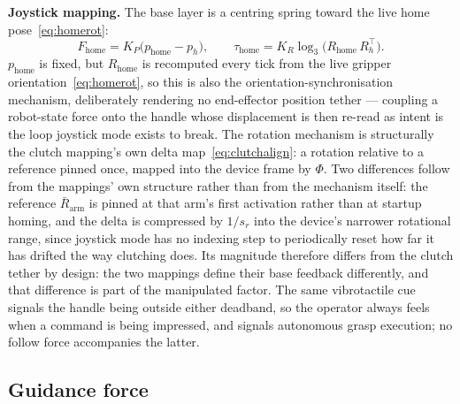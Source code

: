 \textbf{Joystick mapping.} The base layer is a centring spring toward the live home pose~\eqref{eq:homerot}:
\begin{equation}
F_{\text{home}} = K_P\bigl(p_{\text{home}} - p_h\bigr),
\qquad
\tau_{\text{home}} = K_R \log_3\!\bigl(R_{\text{home}}\,R_h^{\top}\bigr).
\label{eq:fhome}
\end{equation}
$p_{\text{home}}$ is fixed, but $R_{\text{home}}$ is recomputed every tick from the live gripper orientation~\eqref{eq:homerot}, so this is also the orientation-synchronisation mechanism, deliberately rendering no end-effector position tether --- coupling a robot-state force onto the handle whose displacement is then re-read as intent is the loop joystick mode exists to break. The rotation mechanism is structurally the clutch mapping's own delta map~\eqref{eq:clutchalign}: a rotation relative to a reference pinned once, mapped into the device frame by $\Phi$. Two differences follow from the mappings' own structure rather than from the mechanism itself: the reference $\bar{R}_{\text{arm}}$ is pinned at that arm's first activation rather than at startup homing, and the delta is compressed by $1/s_r$ into the device's narrower rotational range, since joystick mode has no indexing step to periodically reset how far it has drifted the way clutching does. Its magnitude therefore differs from the clutch tether by design: the two mappings define their base feedback differently, and that difference is part of the manipulated factor. The same vibrotactile cue signals the handle being outside either deadband, so the operator always feels when a command is being impressed, and signals autonomous grasp execution; no follow force accompanies the latter.

\subsection{Guidance force}
\label{sec:guidance}

